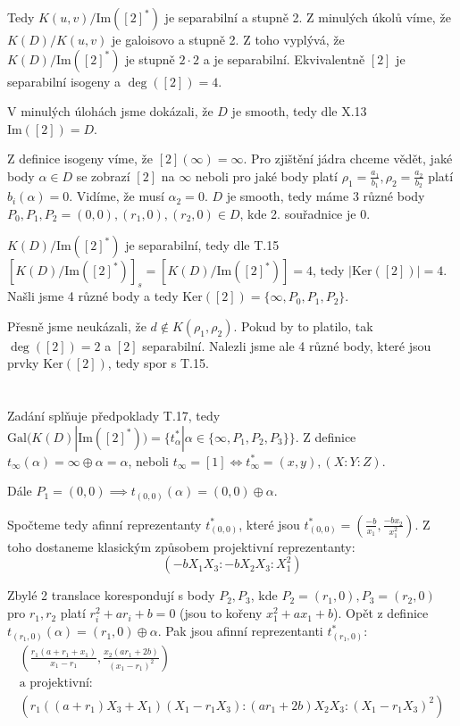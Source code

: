\documentclass[12pt, a4paper]{article}
\begin{document}
Tedy $K(u,v)/\text{Im}([2]^*)$ je separabilní a stupně 2. Z minulých úkolů víme, že $K(D)/K(u,v)$ je galoisovo a stupně 2. Z toho vyplývá, že $K(D)/\text{Im}([2]^*)$ je stupně $2\cdot2$ a je separabilní. Ekvivalentně $[2]$ je separabilní isogeny a $\deg([2])=4$.

V minulých úlohách jsme dokázali, že $D$ je smooth, tedy dle X.13 $\text{Im}([2])=D$.

Z definice isogeny víme, že $[2](\infty) = \infty$. Pro zjištění jádra chceme vědět, jaké body $\alpha \in D$ se zobrazí $[2]$ na $\infty$ neboli pro jaké body platí $\rho_1 = \frac{a_1}{b_1}, \rho_2 = \frac{a_2}{b_2}$ platí $b_i(\alpha)=0$. Vidíme, že musí $\alpha_2 = 0$. $D$ je smooth, tedy máme $3$ různé body $P_0,P_1,P_2 = (0,0),(r_1,0),(r_2,0) \in D$, kde 2. souřadnice je 0.

$K(D)/\text{Im}([2]^*)$ je separabilní, tedy dle T.15 $[K(D)/\text{Im}([2]^*)]_s = [K(D)/\text{Im}([2]^*)] = 4$, tedy $|\text{Ker}([2])|=4$. Našli jsme 4 různé body a tedy $\text{Ker}([2]) = \{\infty, P_0, P_1, P_2\}$. 

Přesně jsme neukázali, že $d \notin K(\rho_1, \rho_2)$. Pokud by to platilo, tak $\deg([2]) = 2$ a $[2]$ separabilní. Nalezli jsme ale 4 různé body, které jsou prvky $\text{Ker}([2])$, tedy spor s T.15.

\section{}
Zadání splňuje předpoklady T.17, tedy $\text{Gal}(K(D)|\text{Im}([2]^*)) = \{t^*_\alpha| \alpha \in \{\infty, P_1, P_2, P_3\}\}$.
Z definice $t_\infty (\alpha) = \infty \oplus \alpha = \alpha$, neboli $t_\infty = [1] \iff t_\infty^* = (x,y), (X:Y:Z)$.

Dále $P_1 = (0,0) \implies t_{(0,0)}(\alpha) = (0,0) \oplus \alpha$.

Spočteme tedy afinní reprezentanty $t_{(0,0)}^*$, které jsou $t_{(0,0)}^* = \left( \frac{-b}{x_1}, \frac{-bx_2}{x_1^2} \right)$. Z toho dostaneme klasickým způsobem projektivní reprezentanty: 
\[(-bX_1X_3 : -bX_2X_3 : X_1^2) \]

Zbylé 2 translace korespondují s body $P_2,P_3$, kde $P_2 = (r_1, 0), P_3 = (r_2, 0)$ pro $r_1,r_2$ platí $r_i^2+ar_i+b = 0$ (jsou to kořeny $x_1^2+ax_1+b$). Opět z definice $t_{(r_1,0)}(\alpha) = (r_1,0) \oplus \alpha$. Pak jsou afinní reprezentanti $t_{(r_1,0)}^*$: 
\begin{gather*}
\left(\frac{r_1(a+r_1+x_1)}{x_1-r_1}, \frac{x_2(ar_1+2b)}{(x_1-r_1)^2} \right )\\
\text{a projektivní:}\\
\left(r_1((a+r_1)X_3 + X_1)(X_1-r_1X_3) : (ar_1+2b)X_2X_3 : (X_1-r_1X_3)^2 \right)
\end{gather*}
\end{document}
